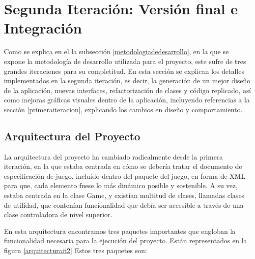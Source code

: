\chapter{Segunda Iteración: Versión final e Integración}
\label{it2}

Como se explica en el la subsección \ref{metodologiadedesarrollo}, en la que se expone la metodología de desarrollo utilizada para el proyecto, este sufre de tres grandes iteraciones para su completitud. En esta sección se explican los detalles implementados en la segunda iteración, es decir, la generación de un mejor diseño de la aplicación, nuevas interfaces, refactorización de clases y código replicado, así como mejoras gráficas visuales dentro de la aplicación, incluyendo referencias a la sección \ref{primeraiteracion}, explicando los cambios en diseño y comportamiento.

\section{Arquitectura del Proyecto}
\label{it2arquitectura}

La arquitectura del proyecto ha cambiado radicalmente desde la primera iteración, en la que estaba centrada en cómo se debería tratar el documento de especificación de juego, incluido dentro del paquete del juego, en forma de XML para que, cada elemento fuese lo más dinámico posible y sostenible. A su vez, estaba centrada en la clase Game, y existían multitud de clases, llamadas clases de utilidad, que contenían funcionalidad que debía ser accesible a través de una clase controladora de nivel superior.

En esta arquitectura encontramos tres paquetes importantes que engloban la funcionalidad necesaria para la ejecución del proyecto. Están representados en la figura \ref{arquitecturait2} Estos tres paquetes son:

